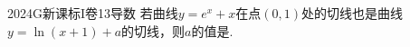 
\begin{problem}{2024}{G}{新课标I卷}{13}{导数}
若曲线$y=e^x+x$在点$(0,1)$处的切线也是曲线$y=\ln(x+1)+a$的切线，则$a$的值是\underline{\hspace{4em}}.
\end{problem}

\begin{answer}

\end{answer}

\begin{solutions}

\end{solutions}